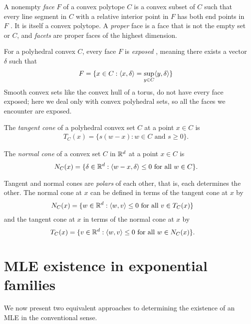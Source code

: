 A nonempty \emph{face} $F$ of a convex polytope $C$ is a convex subset of $C$ such that 
every line segment in $C$ with a relative interior point in $F$ has 
both end points in $F$ \citep[Section 18]{Rockafellar:1970}.  It is itself a convex polytope.
A \emph{proper} face is a face that is not the empty set or $C$, and 
\emph{facets} are proper faces of the highest dimension.

For a polyhedral convex $C$, every face $F$ is \emph{exposed} \citep[Section 18]{Rockafellar:1970}, 
meaning there exists a vector $\delta$ such that
\begin{align*}
	F = \{ x \in C: \langle x, \delta \rangle = \sup_{y \in C} \langle y,\delta \rangle  \}
\end{align*}
Smooth convex sets like the convex hull of a torus, do not have every face
exposed; here we deal only with convex polyhedral sets, so all the faces we
encounter are exposed.


The \emph{tangent cone} of a polyhedral convex set $C$ at a point $x \in C$ is
\begin{align*}
	T_C(x) = \{s(w-x):w \in C \text{ and } s \geq 0 \}.
\end{align*}


The \emph{normal cone} of a convex set $C$ in ${\mathbb R}^d$ at a point $x \in C$ is 
\begin{align*}
	N_C(x) = \{ \delta \in {\mathbb R}^d: \langle w-x,\delta \rangle \leq 0 \text{ for all } w \in C 
\}.
\end{align*}

Tangent and normal cones are \emph{polars} of each other, that is, each determines the other.  
The normal cone at $x$ can be defined in terms of the tangent cone at $x$ by
\begin{align*}
	N_C(x) 	&= \{ w \in {\mathbb R}^d: \langle  w, v  \rangle \leq 0 \text{ for all } v \in T_C(x) \} 
\end{align*}
and the tangent cone at $x$ in terms of the normal cone at $x$ by
\begin{align*}
	T_C(x) 	&= \{ v \in {\mathbb R}^d: \langle  w, v  \rangle \leq 0 \text{ for all } w \in N_C(x) \}.
\end{align*}




\section{MLE existence in exponential families} \label{S:MLE existence}
We now present two equivalent approaches to determining the existence of an MLE
in the conventional sense.  


